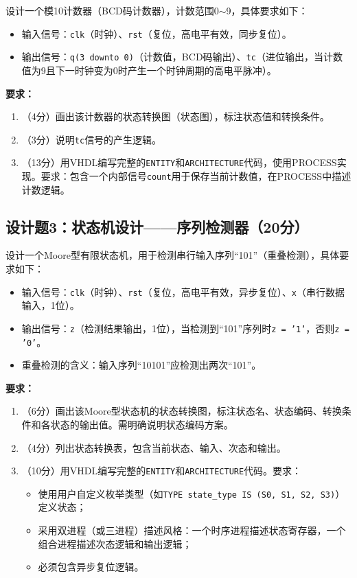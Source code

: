 设计一个模10计数器（BCD码计数器），计数范围0$\sim$9，具体要求如下：

\begin{itemize}
  \item 输入信号：\texttt{clk}（时钟）、\texttt{rst}（复位，高电平有效，同步复位）。
  \item 输出信号：\texttt{q(3~downto~0)}（计数值，BCD码输出）、\texttt{tc}（进位输出，当计数值为9且下一时钟变为0时产生一个时钟周期的高电平脉冲）。
\end{itemize}

\medskip
\noindent\textbf{要求：}
\begin{enumerate}[label=(\arabic*)]
  \item （4分）画出该计数器的状态转换图（状态图），标注状态值和转换条件。
  \item （3分）说明\texttt{tc}信号的产生逻辑。
  \item （13分）用VHDL编写完整的\texttt{ENTITY}和\texttt{ARCHITECTURE}代码，使用PROCESS实现。要求：包含一个内部信号\texttt{count}用于保存当前计数值，在PROCESS中描述计数逻辑。
\end{enumerate}

\subsection*{设计题3：状态机设计——序列检测器（20分）}

设计一个Moore型有限状态机，用于检测串行输入序列``101''（重叠检测），具体要求如下：

\begin{itemize}
  \item 输入信号：\texttt{clk}（时钟）、\texttt{rst}（复位，高电平有效，异步复位）、\texttt{x}（串行数据输入，1位）。
  \item 输出信号：\texttt{z}（检测结果输出，1位），当检测到``101''序列时\texttt{z = '1'}，否则\texttt{z = '0'}。
  \item 重叠检测的含义：输入序列``10101''应检测出两次``101''。
\end{itemize}

\medskip
\noindent\textbf{要求：}
\begin{enumerate}[label=(\arabic*)]
  \item （6分）画出该Moore型状态机的状态转换图，标注状态名、状态编码、转换条件和各状态的输出值。需明确说明状态编码方案。
  \item （4分）列出状态转换表，包含当前状态、输入、次态和输出。
  \item （10分）用VHDL编写完整的\texttt{ENTITY}和\texttt{ARCHITECTURE}代码。要求：
  \begin{itemize}
    \item 使用用户自定义枚举类型（如\texttt{TYPE state\_type IS (S0, S1, S2, S3)}）定义状态；
    \item 采用双进程（或三进程）描述风格：一个时序进程描述状态寄存器，一个组合进程描述次态逻辑和输出逻辑；
    \item 必须包含异步复位逻辑。
  \end{itemize}
\end{enumerate}

\endinput
